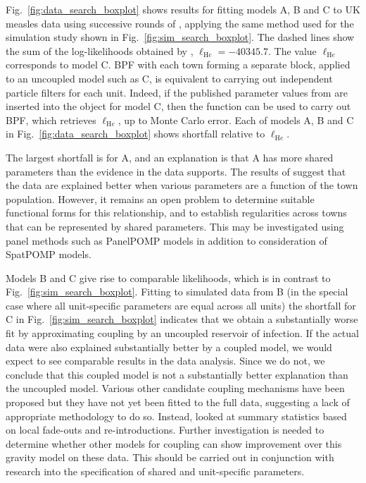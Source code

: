 \documentclass[12pt]{article}\usepackage[]{graphicx}\usepackage[]{xcolor}
\begin{document}
Fig.~\ref{fig:data_search_boxplot} shows results for fitting models A, B and C to UK measles data using successive rounds of {\ibpf}, applying the same method used for the simulation study shown in Fig.~\ref{fig:sim_search_boxplot}.
The dashed lines show the sum of the log-likelihoods obtained by \citet{he10}, $\ell_{\mathrm He}=-40345.7$.
The value $\ell_{\mathrm He}$ corresponds to model C.
BPF with each town forming a separate block, applied to an uncoupled model such as C, is equivalent to carrying out independent particle filters for each unit.
Indeed, if the published parameter values from \citet{he10} are inserted into the  object for model C, then the  function can be used to carry out BPF, which retrieves $\ell_{\mathrm He}$, up to Monte Carlo error.
Each of models A, B and C in Fig.~\ref{fig:data_search_boxplot} shows shortfall relative to $\ell_{\mathrm He}$.

The largest shortfall is for A, and an explanation is that A has more shared parameters than the evidence in the data supports.
The results of \citet{he10} suggest that the data are explained better when various parameters are a function of the town population.
However, it remains an open problem to determine suitable functional forms for this relationship, and to establish regularities across towns that can be represented by shared parameters.
This may be investigated using panel methods such as PanelPOMP models \citep{breto19} in addition to consideration of SpatPOMP models.

Models B and C give rise to comparable likelihoods, which is in contrast to Fig.~\ref{fig:sim_search_boxplot}.
Fitting to simulated data from B (in the special case where all unit-specific parameters are equal across all units) the shortfall for C in Fig.~\ref{fig:sim_search_boxplot} indicates that we obtain a substantially worse fit by approximating coupling by an uncoupled reservoir of infection.
If the actual data were also explained substantially better by a coupled model, we would expect to see comparable results in the data analysis.
Since we do not, we conclude that this coupled model is not a substantially better explanation than the uncoupled model.
Various other candidate coupling mechanisms have been proposed \citep{bjornstad19} but they have not yet been fitted to the full data, suggesting a lack of appropriate methodology to do so.
Instead, \citet{bjornstad19} looked at summary statistics based on local fade-outs and re-introductions.
Further investigation is needed to determine whether other models for coupling can show improvement over this gravity model on these data.
This should be carried out in conjunction with research into the specification of shared and unit-specific parameters.
\end{document}

